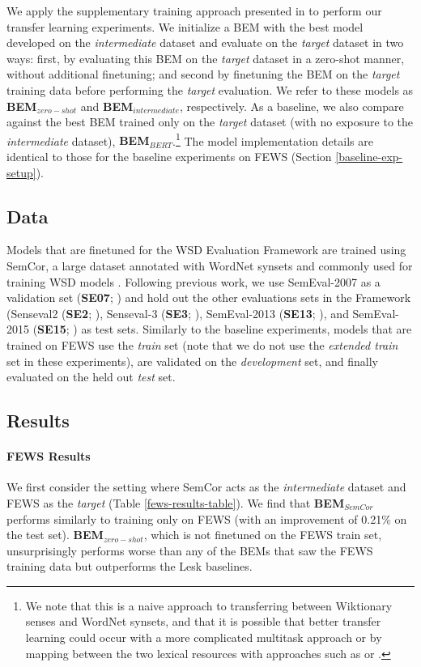 \documentclass[11pt,a4paper]{article}
\begin{document}
We apply the supplementary training approach presented in \citet{phang2018sentence} to perform our transfer learning experiments.  We initialize a BEM with the best model developed on the \textit{intermediate} dataset and evaluate on the \textit{target} dataset in two ways: first, by evaluating this BEM on the \textit{target} dataset in a zero-shot manner, without additional finetuning; and second by finetuning the BEM on the \textit{target} training data before performing the \textit{target} evaluation. We refer to these models as \textbf{BEM$_{zero-shot}$} and  \textbf{BEM$_{intermediate}$}, respectively. As a baseline, we also compare against the best BEM trained only on the \textit{target} dataset (with no exposure to the \textit{intermediate} dataset), \textbf{BEM$_{BERT}$}.\footnote{We note that this is a naive approach to transferring between Wiktionary senses and WordNet synsets, and that it is possible that better transfer learning could occur with a more complicated multitask approach or by mapping between the two lexical resources with approaches such as \citet{navigli2012babelnet} or \citet{miller2014wordnet}.} The model implementation details are identical to those for the baseline experiments on FEWS (Section \ref{baseline-exp-setup}).

\subsection{Data}
Models that are finetuned for the WSD Evaluation Framework are trained using SemCor, a large dataset annotated with WordNet synsets and commonly used for training WSD models \cite{miller1993semantic}. Following previous work, we use SemEval-2007 as a validation set (\textbf{SE07}; \cite{pradhan2007semeval}) and hold out the other evaluations sets in the Framework (Senseval2 (\textbf{SE2}; \cite{palmer2001english}), Senseval-3 (\textbf{SE3}; \cite{snyder2004english}), SemEval-2013 (\textbf{SE13}; \cite{navigli2013semeval}), and SemEval-2015 (\textbf{SE15}; \cite{moro2015semeval}) as test sets. Similarly to the baseline experiments, models that are trained on FEWS use the \textit{train} set (note that we do not use the \textit{extended train} set in these experiments), are validated on the \textit{development} set, and finally evaluated on the held out \textit{test} set.

\subsection{Results}
\paragraph{FEWS Results} We first consider the setting where SemCor acts as the \textit{intermediate} dataset and FEWS as the \textit{target} (Table \ref{fews-results-table}).
We find that \textbf{BEM$_{SemCor}$} performs similarly to training only on FEWS (with an improvement of 0.21\% on the test set). \textbf{BEM$_{zero-shot}$}, which is not finetuned on the FEWS train set, unsurprisingly performs worse than any of the BEMs that saw the FEWS training data but outperforms the Lesk baselines.
\end{document}
